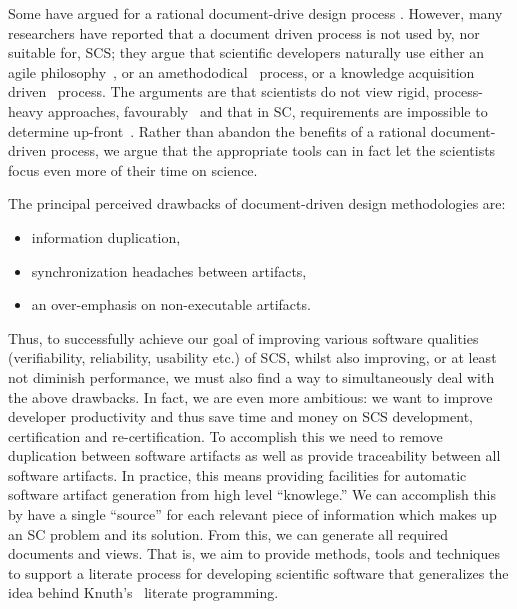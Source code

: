 \documentclass{sig-alternate-05-2015}
\begin{document}
Some have argued for a rational document-drive design process 
\cite{SmithAndKoothoor2016}.  However, many researchers have
reported that a document driven process is not used by, nor suitable for, SCS;
they argue that scientific developers naturally use either an agile
philosophy~\cite{CarverEtAl2007, EasterbrookAndJohns2009, Segal2005}, or an
amethododical~\cite{Kelly2013} process, or a knowledge acquisition
driven~\cite{Kelly2015} process.  The arguments are that scientists do not
view rigid, process-heavy approaches, favourably~\cite{CarverEtAl2007} and that
in SC, requirements are impossible to determine up-front~\cite{CarverEtAl2007,
  SegalAndMorris2008}.  Rather than abandon the benefits of a rational
document-driven process, we argue that the appropriate tools can in fact
let the scientists focus even more of their time on science.

The principal perceived drawbacks of document-driven design methodologies are:
\begin{itemize}
\setlength{\itemsep}{0.0em}
\setlength{\parskip}{0pt}
\setlength{\parsep}{0pt}
\item information duplication,
\item synchronization headaches between artifacts,
\item an over-emphasis on non-executable artifacts.
\end{itemize}

Thus, to successfully achieve our goal of improving various software qualities
(verifiability, reliability, usability etc.) of SCS, whilst also improving,
or at least not diminish performance, we must also find a way to simultaneously
deal with the above drawbacks.  In fact, we are even more ambitious: we want
to improve developer productivity and thus save time and money on SCS
development, certification and re-certification. To accomplish this we need to
remove duplication between software artifacts \cite{WilsonEtAl2013} as well as
provide traceability between all software artifacts. In practice, this means
providing facilities for automatic software artifact generation from high level
``knowlege.'' We can accomplish this by have a single ``source'' for each
relevant piece of information which makes up an SC problem and its solution.
From this, we can generate all required documents and views.
That is, we aim to provide methods, tools and techniques to support a literate
process for developing scientific software that generalizes the idea behind
Knuth's~\cite{Knuth1984} literate programming.
\end{document}
